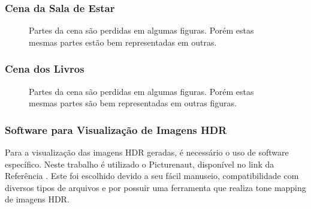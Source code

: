 \subsubsection{Cena da Sala de Estar} \label{cenaPorquinho}


\begin{figure}[H]
  \quad %
  \quad %
  \quad %
  \caption{Partes da cena são perdidas em algumas figuras. Porém estas mesmas partes estão bem representadas em outras.}
  \label{figBasePorquinho}
\end{figure}


\subsubsection{Cena dos Livros} \label{cenaOlhinhos}

\begin{figure}[H]
  \quad %
  \quad %
  \quad %
  \quad %
  \caption{Partes da cena são perdidas em algumas figuras. Porém estas mesmas partes são bem representadas em outras figuras.}
  \label{figBaseOlhinhos}
\end{figure}

\subsubsection{Software para Visualização de Imagens HDR} \label{baseImgPicturenaut}

Para a visualização das imagens HDR geradas, é necessário o uso de software específico. Neste trabalho é utilizado o Picturenaut, disponível no link da Referência \cite{picturenaut}. Este foi escolhido devido a seu fácil manuseio, compatibilidade com diversos tipos de arquivos e por possuir uma ferramenta que realiza tone mapping de imagens HDR.
